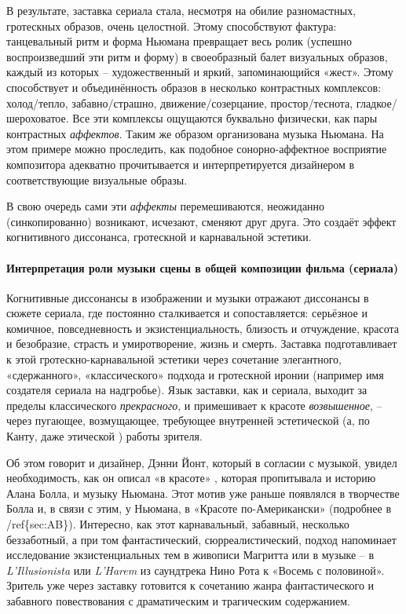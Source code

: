 В результате, заставка сериала стала, несмотря на обилие разномастных, гротескных образов, очень целостной.
Этому способствуют фактура: танцевальный ритм и форма Ньюмана превращает весь ролик (успешно воспроизведший эти ритм и форму) в своеобразный балет визуальных образов, каждый из которых -- художественный и яркий, запоминающийся «жест».
Этому способствует и объединённость образов в несколько контрастных комплексов: холод/тепло, забавно/страшно, движение/созерцание, простор/теснота, гладкое/шероховатое.
Все эти комплексы ощущаются буквально физически, как пары контрастных \emph{аффектов}.
Таким же образом организована музыка Ньюмана.
На этом примере можно проследить, как подобное сонорно-аффектное восприятие композитора адекватно прочитывается и интерпретируется дизайнером в соответствующие визуальные образы.

В свою очередь сами эти \emph{аффекты} перемешиваются, неожиданно (синкопированно) возникают, исчезают, сменяют друг друга.
Это создаёт эффект когнитивного диссонанса, гротескной и карнавальной эстетики.

\paragraph{Интерпретация роли музыки сцены в общей композиции фильма (сериала)}\label{ux438ux43dux442ux435ux440ux43fux440ux435ux442ux430ux446ux438ux44f-ux440ux43eux43bux438-ux43cux443ux437ux44bux43aux438-ux441ux446ux435ux43dux44b-ux432-ux43eux431ux449ux435ux439-ux43aux43eux43cux43fux43eux437ux438ux446ux438ux438-ux444ux438ux43bux44cux43cux430-ux441ux435ux440ux438ux430ux43bux430}

Когнитивные диссонансы в изображении и музыки отражают диссонансы в сюжете сериала, где постоянно сталкивается и сопоставляется: серьёзное и комичное, повседневность и экзистенциальность, близость и отчуждение, красота и безобразие, страсть и умиротворение, жизнь и смерть.
Заставка подготавливает к этой гротескно-карнавальной эстетики через сочетание элегантного, «сдержанного», «классического» подхода и гротескной иронии (например имя создателя сериала на надгробье).
Язык заставки, как и сериала, выходит за пределы классического \emph{прекрасного}, и примешивает к красоте \emph{возвышенное}, -- через пугающее, возмущающее, требующее внутренней эстетической (а, по Канту, даже этической \autocite{kant.sujdenie.1790}) работы зрителя.

Об этом говорит и дизайнер, Дэнни Йонт, который в согласии с музыкой, увидел необходимость, как он описал «в красоте» \autocite{yount.SFUTitles.2012}, которая пропитывала и историю Алана Болла, и музыку Ньюмана.
Этот мотив уже раньше появлялся в творчестве Болла и, в связи с этим, у Ньюмана, в «Красоте по-Американски» (подробнее в /ref\{sec:AB\}).
Интересно, как этот карнавальный, забавный, несколько беззаботный, а при том фантастический, сюрреалистический, подход напоминает исследование экзистенциальных тем в живописи Магритта или в музыке -- в \emph{L'Illusionista} или \emph{L'Harem} из саундтрека Нино Рота к «Восемь с половиной».
Зритель уже через заставку готовится к сочетанию жанра фантастического и забавного повествования с драматическим и трагическим содержанием.

